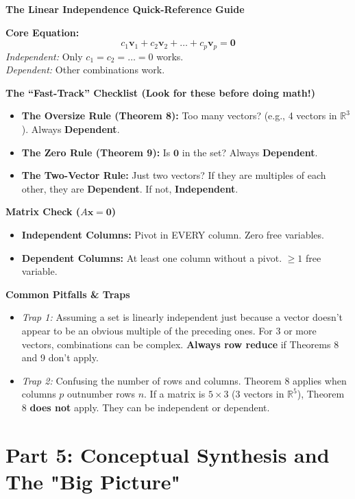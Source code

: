 \documentclass[11pt]{article}
\begin{document}
\begin{mdframed}[backgroundcolor=gray!10, roundcorner=10pt]
\textbf{The Linear Independence Quick-Reference Guide}

\textbf{Core Equation:} 
\[ c_1\mathbf{v}_1 + c_2\mathbf{v}_2 + \dots + c_p\mathbf{v}_p = \mathbf{0} \]
\textit{Independent:} Only $c_1 = c_2 = \dots = 0$ works.\\
\textit{Dependent:} Other combinations work.

\textbf{The ``Fast-Track'' Checklist (Look for these before doing math!)}
\begin{itemize}
    \item \textbf{The Oversize Rule (Theorem 8):} Too many vectors? (e.g., 4 vectors in $\mathbb{R}^3$). Always \textbf{Dependent}.
    \item \textbf{The Zero Rule (Theorem 9):} Is $\mathbf{0}$ in the set? Always \textbf{Dependent}.
    \item \textbf{The Two-Vector Rule:} Just two vectors? If they are multiples of each other, they are \textbf{Dependent}. If not, \textbf{Independent}.
\end{itemize}

\textbf{Matrix Check ($A\mathbf{x} = \mathbf{0}$)}
\begin{itemize}
    \item \textbf{Independent Columns:} Pivot in EVERY column. Zero free variables.
    \item \textbf{Dependent Columns:} At least one column without a pivot. $\geq 1$ free variable.
\end{itemize}

\textbf{Common Pitfalls \& Traps}
\begin{itemize}
    \item \textit{Trap 1:} Assuming a set is linearly independent just because a vector doesn't appear to be an obvious multiple of the preceding ones. For 3 or more vectors, combinations can be complex. \textbf{Always row reduce} if Theorems 8 and 9 don't apply.
    \item \textit{Trap 2:} Confusing the number of rows and columns. Theorem 8 applies when columns $p$ outnumber rows $n$. If a matrix is $5 \times 3$ (3 vectors in $\mathbb{R}^5$), Theorem 8 \textbf{does not} apply. They can be independent or dependent.
\end{itemize}
\end{mdframed}

\newpage

\section{Part 5: Conceptual Synthesis and The "Big Picture"}
\end{document}
